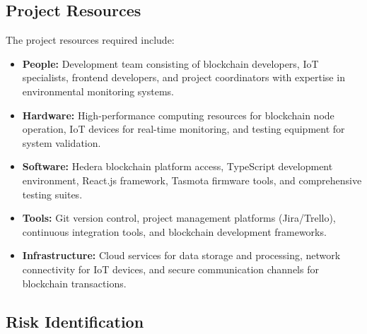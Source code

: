 \documentclass[oneside,a4paper,12pt]{book}
\begin{document}
\subsection{Project Resources}
The project resources required include:

\begin{itemize}
    \item \textbf{People:} Development team consisting of blockchain developers, IoT specialists, frontend developers, and project coordinators with expertise in environmental monitoring systems.
    \item \textbf{Hardware:} High-performance computing resources for blockchain node operation, IoT devices for real-time monitoring, and testing equipment for system validation.
    \item \textbf{Software:} Hedera blockchain platform access, TypeScript development environment, React.js framework, Tasmota firmware tools, and comprehensive testing suites.
    \item \textbf{Tools:} Git version control, project management platforms (Jira/Trello), continuous integration tools, and blockchain development frameworks.
    \item \textbf{Infrastructure:} Cloud services for data storage and processing, network connectivity for IoT devices, and secure communication channels for blockchain transactions.
\end{itemize}

\subsection{Risk Identification}
\end{document}
